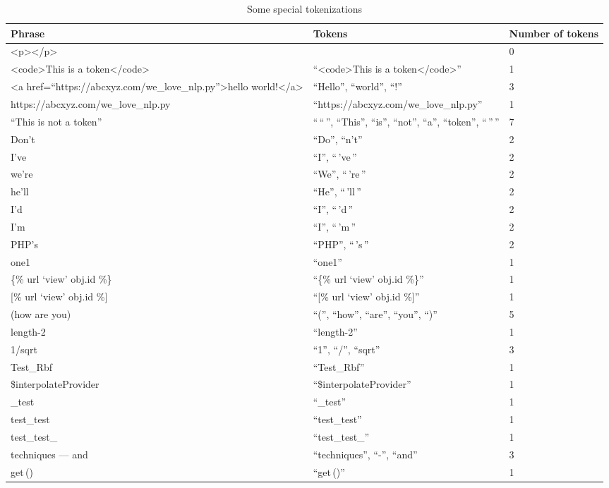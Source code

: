 \onecolumn
\begin{table}
\caption{Some special tokenizations}\label{tok}
\begin{tabu}{X[5,l]X[5,l]X[2,l]}
    \textbf{Phrase} & \textbf{Tokens} &
    \textbf{Number of tokens} \\
    \midrule
    <p></p> && 0 \\
    <code>This is a token</code> &
    ``<code>This is a token</code>'' & 1 \\
    <a href=``https://abcxyz.com/we\_love\_nlp.py''>hello world!</a> &
    ``Hello'', ``world'', ``!'' & 3 \\
    https://abcxyz.com/we\_love\_nlp.py &
    ``https://abcxyz.com/we\_love\_nlp.py'' & 1 \\
    ``This is not a token'' &
    ``\,``\,'', ``This'', ``is'', ``not'', ``a'', ``token'', ``\,''\,'' & 7 \\
    Don't & ``Do'', ``n't'' & 2 \\
    I've & ``I'', ``\,'ve\,'' & 2 \\
    we're & ``We'', ``\,'re\,'' & 2 \\
    he'll & ``He'', ``\,'ll\,'' & 2 \\
    I'd & ``I'', ``\,'d\,'' & 2 \\
    I'm & ``I'', ``\,'m\,'' & 2 \\
    PHP's & ``PHP'', ``\,'s\,'' & 2 \\
    one1 & ``one1'' & 1 \\
    \{\% url `view' obj.id \%\} &
    ``\{\% url `view' obj.id \%\}'' & 1 \\
    {[}\% url `view' obj.id \%{]} &
    ``[\% url `view' obj.id \%]'' & 1 \\
    (how are you) &
    ``('', ``how'', ``are'', ``you'', ``)'' & 5 \\
    length-2 & ``length-2'' & 1 \\
    1/sqrt & ``1'', ``/'', ``sqrt'' & 3 \\
    Test\_Rbf & ``Test\_Rbf'' & 1 \\
    \$interpolateProvider & ``\$interpolateProvider'' & 1 \\
    \_test & ``\_test'' & 1 \\
    test\_test & ``test\_test'' & 1 \\
    test\_test\_ & ``test\_test\_'' & 1 \\
    techniques --- and & ``techniques'', ``-'', ``and'' & 3 \\
    get\,() & ``get\,()'' & 1 \\

\end{tabu}
\end{table}

